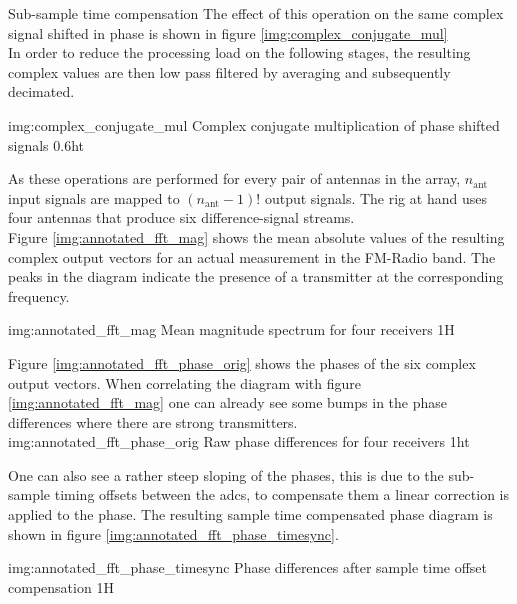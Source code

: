 \begin{subchapter}{Sub-sample time compensation}
  The effect of this operation on the same complex signal
  shifted in phase is shown in figure \ref{img:complex_conjugate_mul} \\

  In order to reduce the processing load on the following stages,
  the resulting complex values are then low pass filtered by
  averaging and subsequently decimated.

               {img:complex_conjugate_mul}
               {Complex conjugate multiplication of phase shifted signals}
               {0.6}{ht}

  As these operations are performed for every pair
  of antennas in the array, $n_\text{ant}$ input
  signals are mapped to $\left(n_\text{ant}-1\right)!$
  output signals.
  The rig at hand uses
  four antennas that produce six difference-signal streams. \\

  Figure \ref{img:annotated_fft_mag} shows the mean
  absolute values of the resulting complex output
  vectors for an actual measurement in the FM-Radio band.
  The peaks in the diagram indicate
  the presence of a transmitter at the corresponding frequency.

               {img:annotated_fft_mag}
               {Mean magnitude spectrum for four receivers}
               {1}{H}

  Figure \ref{img:annotated_fft_phase_orig} shows the phases
  of the six complex output vectors. When correlating the
  diagram with figure \ref{img:annotated_fft_mag} one can already
  see some bumps in the phase differences where there are strong transmitters. \\

               {img:annotated_fft_phase_orig}
               {Raw phase differences for four receivers}
               {1}{ht}

  One can also see a rather steep sloping of the phases,
  this is due to the sub-sample timing offsets between the
  \glspl{adc}, to compensate them a linear correction is applied
  to the phase.
  The resulting sample time compensated phase diagram is shown in
  figure \ref{img:annotated_fft_phase_timesync}.

               {img:annotated_fft_phase_timesync}
               {Phase differences after sample time offset compensation}
               {1}{H}
\end{subchapter}

